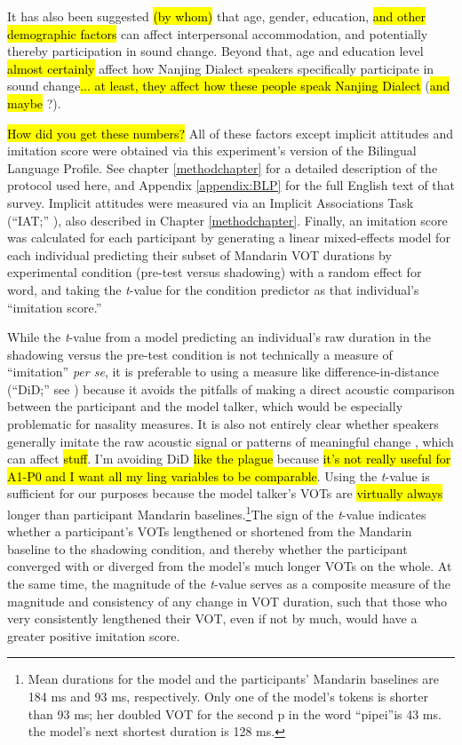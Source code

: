 It has also been suggested \hl{(by whom)} that age, gender, education, \hl{and other demographic factors} can affect interpersonal accommodation, and potentially thereby participation in sound change. Beyond that, age and education level \hl{almost certainly} affect how Nanjing Dialect speakers specifically participate in sound change\hl{... at least, they affect how these people speak Nanjing Dialect} \citep{bao1980sixty} (\hl{and maybe} \citealp{xu2006nanjing}?).

\hl{How did you get these numbers?}
All of these factors except implicit attitudes and imitation score were obtained via this experiment's version of the Bilingual Language Profile. See chapter \ref{methodchapter} for a detailed description of the protocol used here, and Appendix \ref{appendix:BLP} for the full English text of that survey. Implicit attitudes were measured via an Implicit Associations Task (``IAT;'' \citealp{greenwald1998measuring,greenwald2003understanding}), also described in Chapter \ref{methodchapter}. Finally, an imitation score was calculated for each participant by generating a linear mixed-effects model for each individual predicting their subset of Mandarin VOT durations by experimental condition (pre-test versus shadowing) with a random effect for word, and taking the \textit{t}-value for the condition predictor as that individual's ``imitation score.''

While the \textit{t}-value from a model predicting an individual's raw duration in the shadowing versus the pre-test condition is not technically a measure of ``imitation'' \textit{per se}, it is preferable to using a measure like difference-in-distance (``DiD;'' see \citealp{babel2010dialect,babel2012evidence}) because it avoids the pitfalls of making a direct acoustic comparison between the participant and the model talker, which would be especially problematic for nasality measures. It is also not entirely clear whether speakers generally imitate the raw acoustic signal or patterns of meaningful change \citep{zellou2016phonetic}, which can affect \hl{stuff}. I'm avoiding DiD \hl{like the plague} because \hl{it's not really useful for A1-P0 and I want all my ling variables to be comparable}. Using the \textit{t}-value is sufficient for our purposes because the  model talker's VOTs are \hl{virtually always} longer than participant Mandarin baselines.\footnote{Mean durations for the model and the participants' Mandarin baselines are 184 ms and 93 ms, respectively. Only one of the model's tokens is shorter than 93 ms; her doubled VOT for the second p in the word ``pipei''is 43 ms. the model's next shortest duration is 128 ms.}The sign of the \textit{t}-value indicates whether a participant's VOTs lengthened or shortened from the Mandarin baseline to the shadowing condition, and thereby whether the participant converged with or diverged from the model's much longer VOTs on the whole. At the same time, the magnitude of the \textit{t}-value serves as a composite measure of the magnitude and consistency of any change in VOT duration, such that those who very consistently lengthened their VOT, even if not by much, would have a greater positive imitation score.


